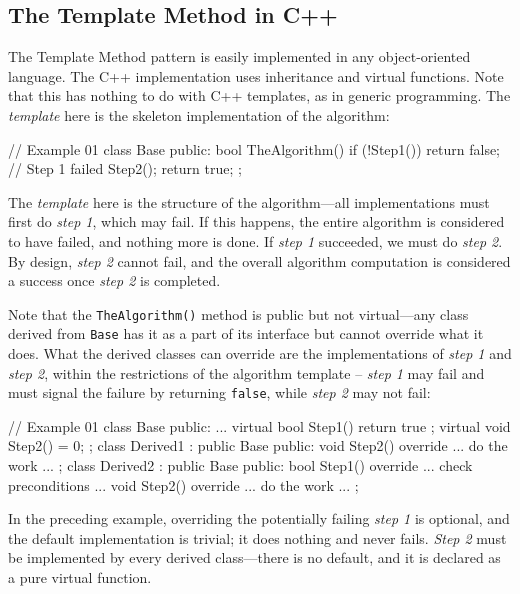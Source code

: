 \subsection{The Template Method in C++}

The Template Method pattern is easily implemented in any object-oriented language. The C++ implementation uses inheritance and virtual functions. Note that this has nothing to do with C++ templates, as in generic programming. The \emph{template} here is the skeleton implementation of the algorithm:

\begin{code}
// Example 01
class Base {
  public:
  bool TheAlgorithm() {
    if (!Step1()) return false; // Step 1 failed
    Step2();
    return true;
  }
};
\end{code}

The \emph{template} here is the structure of the algorithm---all implementations must first do \emph{step 1}, which may fail. If this happens, the entire algorithm is considered to have failed, and nothing more is done. If \emph{step 1} succeeded, we must do \emph{step 2}. By design, \emph{step 2} cannot fail, and the overall algorithm computation is considered a success once \emph{step 2} is completed.

Note that the \texttt{TheAlgorithm()} method is public but not virtual---any class derived from \texttt{Base} has it as a part of its interface but cannot override what it does. What the derived classes can override are the implementations of \emph{step 1} and \emph{step 2}, within the restrictions of the algorithm template -- \emph{step 1} may fail and must signal the failure by returning \texttt{false}, while \emph{step 2} may not fail:

\begin{code}
// Example 01
class Base {
  public:
  ...
  virtual bool Step1() { return true };
  virtual void Step2() = 0;
};
class Derived1 : public Base {
  public:
  void Step2() override { ... do the work ... }
};
class Derived2 : public Base {
  public:
  bool Step1() override { ... check preconditions ... }
  void Step2() override { ... do the work ... }
};
\end{code}

In the preceding example, overriding the potentially failing \emph{step 1} is optional, and the default implementation is trivial; it does nothing and never fails. \emph{Step 2} must be implemented by every derived class---there is no default, and it is declared as a pure virtual function.

